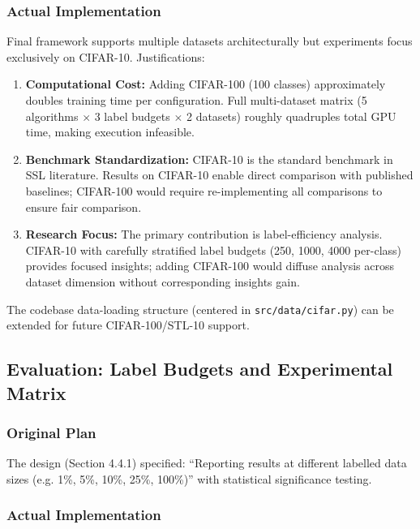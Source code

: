 \subsubsection{Actual Implementation}

Final framework supports multiple datasets architecturally but experiments focus exclusively on CIFAR-10. Justifications:

\begin{enumerate}
    \item \textbf{Computational Cost:} Adding CIFAR-100 (100 classes) approximately doubles training time per configuration. Full multi-dataset matrix (5 algorithms $\times$ 3 label budgets $\times$ 2 datasets) roughly quadruples total GPU time, making execution infeasible.

    \item \textbf{Benchmark Standardization:} CIFAR-10 is the standard benchmark in SSL literature. Results on CIFAR-10 enable direct comparison with published baselines; CIFAR-100 would require re-implementing all comparisons to ensure fair comparison.

    \item \textbf{Research Focus:} The primary contribution is label-efficiency analysis. CIFAR-10 with carefully stratified label budgets (250, 1000, 4000 per-class) provides focused insights; adding CIFAR-100 would diffuse analysis across dataset dimension without corresponding insights gain.
\end{enumerate}

The codebase data-loading structure (centered in \texttt{src/data/cifar.py}) can be extended for future CIFAR-100/STL-10 support.

\subsection{Evaluation: Label Budgets and Experimental Matrix}

\subsubsection{Original Plan}

The design (Section 4.4.1) specified: ``Reporting results at different labelled data sizes (e.g. 1\%, 5\%, 10\%, 25\%, 100\%)'' with statistical significance testing.

\subsubsection{Actual Implementation}

